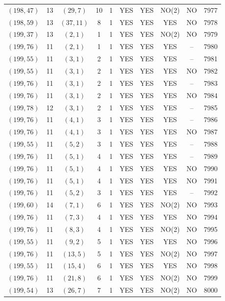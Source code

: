 \begin{longtable}{|c|c|c|c|c|c|c|c|c|c|}
$(198, 47)$ & 13 & $(29, 7)$ & 10 & 1 & YES & YES & NO(2) & NO & 7977\\
$(198, 59)$ & 13 & $(37, 11)$ & 8 & 1 & YES & YES & YES & NO & 7978\\
$(199, 37)$ & 13 & $(2, 1)$ & 1 & 1 & YES & YES & NO(2) & NO & 7979\\
$(199, 76)$ & 11 & $(2, 1)$ & 1 & 1 & YES & YES & YES & -- & 7980\\
$(199, 55)$ & 11 & $(3, 1)$ & 2 & 1 & YES & YES & YES & -- & 7981\\
$(199, 55)$ & 11 & $(3, 1)$ & 2 & 1 & YES & YES & YES & NO & 7982\\
$(199, 76)$ & 11 & $(3, 1)$ & 2 & 1 & YES & YES & YES & -- & 7983\\
$(199, 76)$ & 11 & $(3, 1)$ & 2 & 1 & YES & YES & YES & NO & 7984\\
$(199, 78)$ & 12 & $(3, 1)$ & 2 & 1 & YES & YES & YES & -- & 7985\\
$(199, 76)$ & 11 & $(4, 1)$ & 3 & 1 & YES & YES & YES & -- & 7986\\
$(199, 76)$ & 11 & $(4, 1)$ & 3 & 1 & YES & YES & YES & NO & 7987\\
$(199, 55)$ & 11 & $(5, 2)$ & 3 & 1 & YES & YES & YES & -- & 7988\\
$(199, 76)$ & 11 & $(5, 1)$ & 4 & 1 & YES & YES & YES & -- & 7989\\
$(199, 76)$ & 11 & $(5, 1)$ & 4 & 1 & YES & YES & YES & NO & 7990\\
$(199, 76)$ & 11 & $(5, 1)$ & 4 & 1 & YES & YES & YES & NO & 7991\\
$(199, 76)$ & 11 & $(5, 2)$ & 3 & 1 & YES & YES & YES & -- & 7992\\
$(199, 60)$ & 14 & $(7, 1)$ & 6 & 1 & YES & YES & NO(2) & NO & 7993\\
$(199, 76)$ & 11 & $(7, 3)$ & 4 & 1 & YES & YES & YES & NO & 7994\\
$(199, 76)$ & 11 & $(8, 3)$ & 4 & 1 & YES & YES & NO(2) & NO & 7995\\
$(199, 55)$ & 11 & $(9, 2)$ & 5 & 1 & YES & YES & YES & NO & 7996\\
$(199, 76)$ & 11 & $(13, 5)$ & 5 & 1 & YES & YES & NO(2) & NO & 7997\\
$(199, 55)$ & 11 & $(15, 4)$ & 6 & 1 & YES & YES & YES & NO & 7998\\
$(199, 76)$ & 11 & $(21, 8)$ & 6 & 1 & YES & YES & NO(2) & NO & 7999\\
$(199, 54)$ & 13 & $(26, 7)$ & 7 & 1 & YES & YES & NO(2) & NO & 8000\\

\end{longtable}
